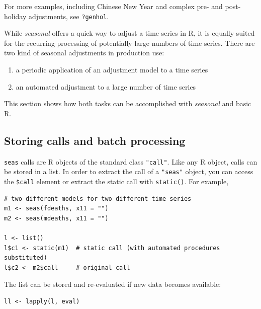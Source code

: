 For more examples, including Chinese New Year and complex pre- and
post-holiday adjustments, see \texttt{?genhol}.


While \emph{seasonal} offers a quick way to adjust a time series in R,
it is equally suited for the recurring processing of potentially large
numbers of time series. There are two kind of seasonal adjustments in
production use:

\begin{enumerate}
\def\labelenumi{\arabic{enumi}.}
\itemsep1pt\parskip0pt
\item
  a periodic application of an adjustment model to a time series
\item
  an automated adjustment to a large number of time series
\end{enumerate}

This section shows how both tasks can be accomplished with
\emph{seasonal} and basic R.

\subsection{Storing calls and batch
processing}\label{storing-calls-and-batch-processing}

\texttt{seas} calls are R objects of the standard class \texttt{"call"}.
Like any R object, calls can be stored in a list. In order to extract
the call of a \texttt{"seas"} object, you can access the \texttt{\$call}
element or extract the static call with \texttt{static()}. For example,

\begin{verbatim}
# two different models for two different time series
m1 <- seas(fdeaths, x11 = "")
m2 <- seas(mdeaths, x11 = "")

l <- list()
l$c1 <- static(m1)  # static call (with automated procedures substituted)
l$c2 <- m2$call     # original call
\end{verbatim}

The list can be stored and re-evaluated if new data becomes available:

\begin{verbatim}
ll <- lapply(l, eval)
\end{verbatim}

